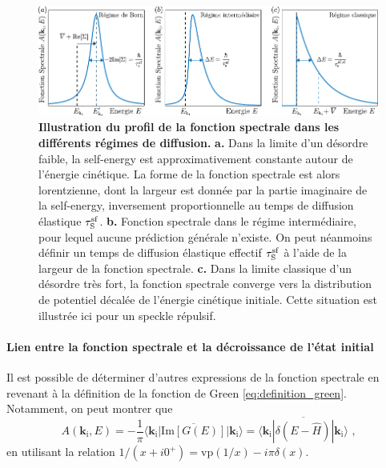 \begin{figure}
\centering
\includegraphics[width=\textwidth]{Fig/TauS_NJP/illustration_fonction_spectrale_diffusion.pdf}
\caption{\textbf{Illustration du profil de la fonction spectrale dans les différents régimes de diffusion.} \textbf{a.} Dans la limite d'un désordre faible, la self-energy est approximativement constante autour de l'énergie cinétique. La forme de la fonction spectrale est alors lorentzienne, dont la largeur est donnée par la partie imaginaire de la self-energy, inversement proportionnelle au temps de diffusion élastique $\tau_{\mathrm{S}}^{\mathrm{sf}}$. \textbf{b.} Fonction spectrale dans le régime intermédiaire, pour lequel aucune prédiction générale n'existe. On peut néanmoins définir un temps de diffusion élastique effectif $\tau_{\mathrm{S}}^{\mathrm{sf}}$ à l'aide de la largeur de la fonction spectrale. \textbf{c.} Dans la limite classique d'un désordre très fort, la fonction spectrale converge vers la distribution de potentiel décalée de l'énergie cinétique initiale. Cette situation est illustrée ici pour un speckle répulsif.}
\label{fig:illustration_fonction_spectrale_diffusion}
\end{figure}


\paragraph*{Lien entre la fonction spectrale et la décroissance de l'état initial}
Il est possible de déterminer d'autres expressions de la fonction spectrale en revenant à la définition de la fonction de Green \ref{eq:definition_green}. Notamment, on peut montrer que
\begin{equation}
A(\mathbf{k}_{\mathrm{i}},E)=-\frac{1}{\pi} \overline{\langle \mathbf{k}_{\mathrm{i}} | \mathrm{Im}\left[G(E)\right]| \mathbf{k}_{\mathrm{i}} \rangle} = \overline{\langle \mathbf{k}_{\mathrm{i}} | \delta(E-\hat{H})|\mathbf{k}_{\mathrm{i}}\rangle} \text{ ,}
\end{equation}
en utilisant la relation $ 1/(x+i0^+)=\mathrm{vp}(1/x)-i\pi \delta(x)$. 

